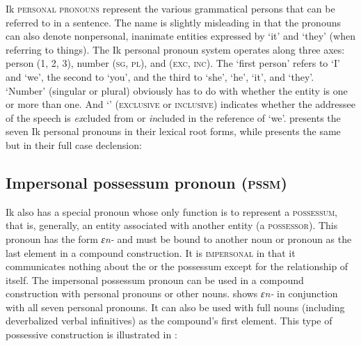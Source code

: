 Ik \textsc{personal pronouns} represent the various grammatical persons that can be referred to in a sentence. The name is slightly misleading in that the pronouns can also denote nonpersonal, inanimate entities expressed by ‘it’ and ‘they’ (when referring to things). The Ik personal pronoun system operates along three axes: person (1, 2, 3), number (\textsc{sg}, \textsc{pl}), and  (\textsc{exc}, \textsc{inc}). The ‘first person’ refers to ‘I’ and ‘we’, the second to ‘you’, and the third to ‘she’, ‘he’, ‘it’, and ‘they’. ‘Number’ (singular or plural) obviously has to do with whether the entity is one or more than one. And ‘’ (\textsc{exclusive} or \textsc{inclusive}) indicates whether the addressee of the speech is \textit{ex}cluded from or \textit{in}cluded in the reference of ‘we’.  presents the seven Ik personal pronouns in their lexical root forms, while  presents the same but in their full case declension:
\newpage 

 

\subsection{Impersonal possessum pronoun (\textsc{pssm})}\label{sec:5.3}


Ik also has a special pronoun whose only function is to represent a \textsc{possessum}, that is, generally, an entity associated with another entity (a \textsc{possessor}). This pronoun has the form \textit{ɛn{\Í}-} and must be bound to another noun or pronoun as the last element in a compound construction. It is \textsc{impersonal} in that it communicates nothing about the  or the possessum except for the relationship of  itself. The impersonal possessum pronoun can be used in a compound construction with personal pronouns or other nouns.  shows \textit{ɛn{\Í}-} in conjunction with all seven personal pronouns. It can also be used with full nouns (including deverbalized verbal infinitives) as the compound’s first element. This type of possessive construction is illustrated in :


